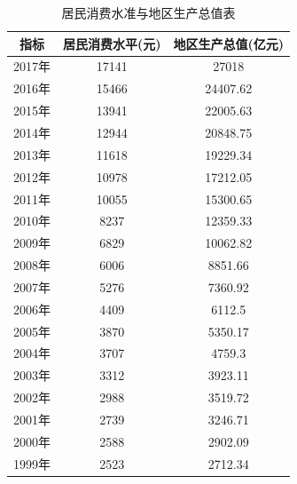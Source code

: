 \documentclass[UTF8,oneside,cs4side]{ctexart}
\begin{document}
    \begin{table}[tb]
    	\centering
    	\caption{居民消费水准与地区生产总值表}
    	\begin{tabular*}{\hsize}{@{}@{\extracolsep{\fill}}ccc@{}}
    		\toprule
    		指标&居民消费水平(元)&地区生产总值(亿元)\\
    		\midrule
    		2017年&17141&27018\\2016年&15466&24407.62\\2015年&13941&22005.63\\2014年&12944&20848.75\\2013年&11618&19229.34\\2012年&10978&17212.05\\2011年&10055&15300.65\\2010年&8237&12359.33\\2009年&6829&10062.82\\2008年&6006&8851.66\\2007年&5276&7360.92\\2006年&4409&6112.5\\2005年&3870&5350.17\\2004年&3707&4759.3\\2003年&3312&3923.11\\2002年&2988&3519.72\\2001年&2739&3246.71\\2000年&2588&2902.09\\1999年&2523&2712.34\\
    		\bottomrule
    	\end{tabular*}
    	\label{tab1}
    \end{table}
    	
\end{document}
